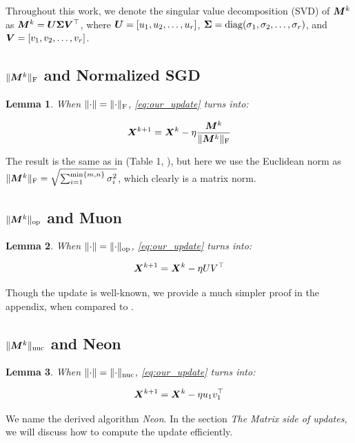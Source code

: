 \documentclass{article} %
\newtheorem{lemma}{Lemma}
\newcommand{\norm}[1]{\lVert #1\rVert}
\DeclarePairedDelimiter{\normf}{\|}{\|_\mathrm{F}}
\DeclarePairedDelimiter{\norms}{\|}{\|_{\mathrm{op}}}
\DeclarePairedDelimiter{\normn}{\|}{\|_{\mathrm{nuc}}}
\DeclareMathOperator{\diag}{diag}
\begin{document}
    Throughout this work, we denote the singular value decomposition (SVD) of ${\bm{M}}^k$ as ${\bm{M}}^k = {\bm{U}} {\bm{\Sigma}} {\bm{V}}^\top$, where ${\bm{U}} = [u_1, u_2, \dots, u_r]$, $\mSigma = \diag(\sigma_1, \sigma_2, \dots, \sigma_r)$, and  ${\bm{V}} = [v_1, v_2, \dots, v_r]$.

    \subsection{\texorpdfstring{$\normf{\mM^{k}}$ and Normalized SGD}{NSGD}}

        \begin{lemma}\label{lemma:nsgd_update}
            When $\norm{\cdot} = \normf{\cdot}$, \cref{eq:our_update} turns into:

            \begin{equation}\label{eq:nsgd_update}
                \mX^{k+1} = \mX^{k} - \eta \frac{\mM^k}{\normf{\mM^k}}
            \end{equation}

        \end{lemma}

        The result is the same as in (Table 1, \cite{pethick2025training}), but here we use the Euclidean norm as $\normf{\mM^k} = \sqrt{\sum_{i=1}^{\min\{m,n\}}\sigma_i^2}$, which clearly is a matrix norm.

    \subsection{\texorpdfstring{$\norms{\mM^{k}}$ and Muon}{Muon}}
    \begin{lemma}\label{lemma:muon_update}
        When $\norm{\cdot} = \norms{\cdot}$, \cref{eq:our_update} turns into:

        \begin{equation}\label{eq:muon_update}
            {\bm{X}}^{k+1} = {\bm{X}}^{k} - \eta U V^\top
        \end{equation}
    \end{lemma}

    Though the update is well-known, we provide a much simpler proof in the appendix, when compared to \cite{bernstein2024oldoptimizernewnorm}.

    \subsection{\texorpdfstring{$\normn{\mM^{k}}$ and Neon}{Neon}}
    \begin{lemma}\label{lemma:neon_update}
        When $\norm{\cdot} = \normn{\cdot}$, \cref{eq:our_update} turns into:

        \begin{equation}\label{eq:neon_update}
            {\bm{X}}^{k+1} = {\bm{X}}^{k} - \eta u_1 v_1^\top
        \end{equation}
    \end{lemma}
        We name the derived algorithm \emph{Neon}. In the section {\it The Matrix side of updates}, we will discuss how to compute the update efficiently.
\end{document}
